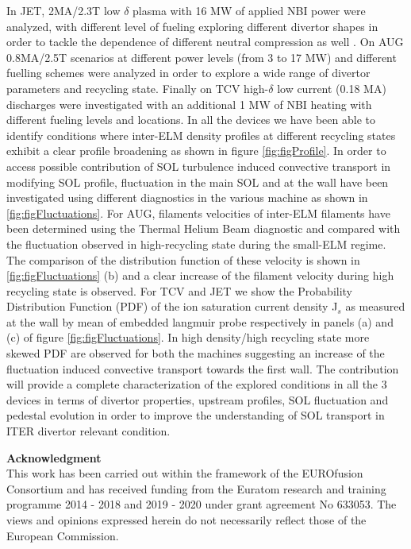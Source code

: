 \documentclass[12pt, a4paper, twoside]{article}
\begin{document}
In JET, 2MA/2.3T low $\delta$ plasma with 16 MW of
applied NBI power were analyzed, with different level of fueling exploring different divertor shapes
in order to tackle the dependence of different neutral compression as well
\cite{Tamain:2015cx}.
On AUG 0.8MA/2.5T scenarios at different power levels (from 3 to 17 MW) and different fuelling
schemes were analyzed in order to explore a wide range of divertor
parameters and recycling state.
Finally on TCV high-$\delta$ low current (0.18 MA)
discharges were investigated with an additional 1 MW of NBI heating
with different fueling levels and locations. In all the devices we have been able to
identify conditions where inter-ELM density profiles at different recycling states exhibit a clear profile broadening as shown in
figure \ref{fig:figProfile}. In order to access possible contribution of SOL
turbulence induced convective transport in modifying SOL profile,
fluctuation in the main SOL and at the wall have been investigated
using different diagnostics in the various machine as shown in
\ref{fig:figFluctuations}. For AUG,  filaments velocities of
inter-ELM filaments have been determined using the Thermal Helium Beam
diagnostic \cite{Griener:20183cf} and compared with the fluctuation
observed in high-recycling state during the small-ELM regime. The
comparison of the distribution function of these velocity is shown in
\ref{fig:figFluctuations} (b) and a clear increase of the filament velocity
during high recycling state is observed. For TCV and JET we show the
Probability Distribution Function (PDF) of the ion saturation current
density J$_s$ as measured at the wall by mean of embedded langmuir
probe respectively in panels (a) and (c) of figure
\ref{fig:figFluctuations}.
In high density/high recycling state more skewed PDF are
observed for both the machines suggesting an increase of the
fluctuation induced convective transport towards the first wall.
The contribution will provide a complete characterization of the
explored conditions in all the 3 devices in terms of divertor properties, upstream
profiles, SOL fluctuation and pedestal evolution in order to improve
the understanding of SOL transport in ITER divertor relevant
condition.

\begingroup
{}
{\footnotesize\textbf{Acknowledgment}\\
This work has been carried out within the framework of the EUROfusion Consortium and has received funding from the Euratom research and training programme 2014 - 2018 and 2019 - 2020 under grant agreement No 633053. The views and opinions expressed herein do not necessarily reflect those of the European Commission.}
\begin{multicols}{2}
\setlength\bibitemsep{0pt}
\printbibliography[heading=none]
\end{multicols}
\endgroup
\end{document}
